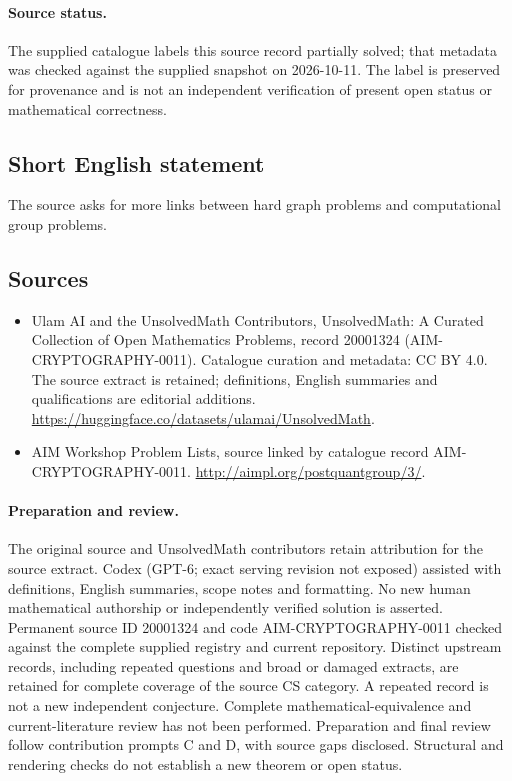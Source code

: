 \documentclass[11pt]{article}
\begin{document}
\paragraph{Source status.}
The supplied catalogue labels this source record partially solved; that metadata was checked against the supplied snapshot on 2026-10-11. The label is preserved for provenance and is not an independent verification of present open status or mathematical correctness.
\subsection{Short English statement}
The source asks for more links between hard graph problems and computational group problems.
\subsection{Sources}
\begin{itemize}
\item[\hypertarget{source:20001324:1}{S1}] Ulam AI and the UnsolvedMath Contributors, UnsolvedMath: A Curated Collection of Open Mathematics Problems, record 20001324 (AIM-CRYPTOGRAPHY-0011). Catalogue curation and metadata: CC BY 4.0. The source extract is retained; definitions, English summaries and qualifications are editorial additions.
\url{https://huggingface.co/datasets/ulamai/UnsolvedMath}.
\item[\hypertarget{source:20001324:2}{S2}] AIM Workshop Problem Lists, source linked by catalogue record AIM-CRYPTOGRAPHY-0011.
\url{http://aimpl.org/postquantgroup/3/}.
\end{itemize}
\paragraph{Preparation and review.}
The original source and UnsolvedMath contributors retain attribution for the source extract. Codex (GPT-6; exact serving revision not exposed) assisted with definitions, English summaries, scope notes and formatting. No new human mathematical authorship or independently verified solution is asserted. Permanent source ID 20001324 and code AIM-CRYPTOGRAPHY-0011 checked against the complete supplied registry and current repository. Distinct upstream records, including repeated questions and broad or damaged extracts, are retained for complete coverage of the source CS category. A repeated record is not a new independent conjecture. Complete mathematical-equivalence and current-literature review has not been performed. Preparation and final review follow contribution prompts C and D, with source gaps disclosed. Structural and rendering checks do not establish a new theorem or open status.
\label{end:20001324}
\end{document}

